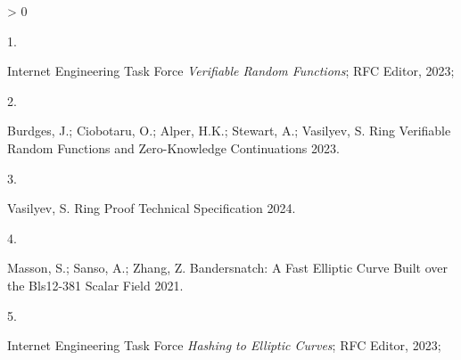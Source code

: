 \documentclass[
]{article}
\newlength{\cslhangindent}
\newlength{\csllabelwidth}
\newenvironment{CSLReferences}[2] %
 {%
  \setlength{\parindent}{0pt}
  \ifodd #1 \everypar{\setlength{\hangindent}{\cslhangindent}}\ignorespaces\fi
  \ifnum #2 > 0
  \setlength{\parskip}{#2\baselineskip}
  \fi
 }%
 {}
\newcommand{\CSLLeftMargin}[1]{\parbox[t]{\csllabelwidth}{#1}}
\newcommand{\CSLRightInline}[1]{\parbox[t]{\linewidth - \csllabelwidth}{#1}\break}
\begin{document}
\hypertarget{refs}{}
\begin{CSLReferences}{0}{0}
\leavevmode\hypertarget{ref-RFC9381}{}%
\CSLLeftMargin{1. }
\CSLRightInline{Internet Engineering Task Force \emph{{Verifiable Random
Functions}}; {RFC Editor}, 2023;}

\leavevmode\hypertarget{ref-BCHSV23}{}%
\CSLLeftMargin{2. }
\CSLRightInline{Burdges, J.; Ciobotaru, O.; Alper, H.K.; Stewart, A.;
Vasilyev, S. Ring Verifiable Random Functions and Zero-Knowledge
Continuations 2023.}

\leavevmode\hypertarget{ref-Vasilyev}{}%
\CSLLeftMargin{3. }
\CSLRightInline{Vasilyev, S. Ring Proof Technical Specification 2024.}

\leavevmode\hypertarget{ref-MSZ21}{}%
\CSLLeftMargin{4. }
\CSLRightInline{Masson, S.; Sanso, A.; Zhang, Z. Bandersnatch: A Fast
Elliptic Curve Built over the Bls12-381 Scalar Field 2021.}

\leavevmode\hypertarget{ref-RFC9380}{}%
\CSLLeftMargin{5. }
\CSLRightInline{Internet Engineering Task Force \emph{{Hashing to
Elliptic Curves}}; {RFC Editor}, 2023;}

\end{CSLReferences}
\end{document}
